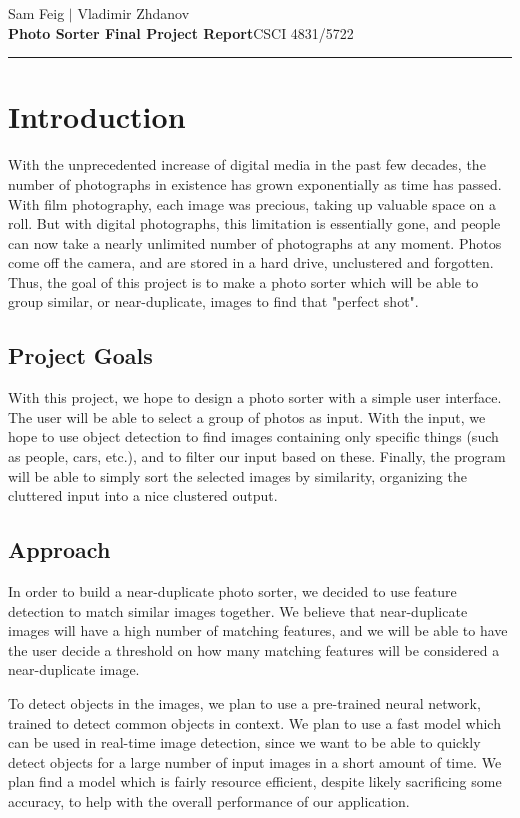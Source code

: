 \documentclass[12pt]{article}
\begin{document}
\hfill Sam Feig $|$ Vladimir Zhdanov \\
\textbf{Photo Sorter Final Project Report}\hfill CSCI 4831/5722 \\
\rule{\textwidth}{.75pt}

\section{Introduction}
With the unprecedented increase of digital media in the past few decades, the number of photographs in existence has grown exponentially as time has passed. With film photography, each image was precious, taking up valuable space on a roll. But with digital photographs, this limitation is essentially gone, and people can now take a nearly unlimited number of photographs at any moment. Photos come off the camera, and are stored in a hard drive, unclustered and forgotten. Thus, the goal of this project is to make a photo sorter which will be able to group similar, or near-duplicate, images to find that "perfect shot".

\subsection{Project Goals}
With this project, we hope to design a photo sorter with a simple user interface. The user will be able to select a group of photos as input. With the input, we hope to use object detection to find images containing only specific things (such as people, cars, etc.), and to filter our input based on these. Finally, the program will be able to simply sort the selected images by similarity, organizing the cluttered input into a nice clustered output.

\subsection{Approach}
In order to build a near-duplicate photo sorter, we decided to use feature detection to match similar images together. We believe that near-duplicate images will have a high number of matching features, and we will be able to have the user decide a threshold on how many matching features will be considered a near-duplicate image. 

To detect objects in the images, we plan to use a pre-trained neural network, trained to detect common objects in context. We plan to use a fast model which can be used in real-time image detection, since we want to be able to quickly detect objects for a large number of input images in a short amount of time. We plan find a model which is fairly resource efficient, despite likely sacrificing some accuracy, to help with the overall performance of our application.
\end{document}
